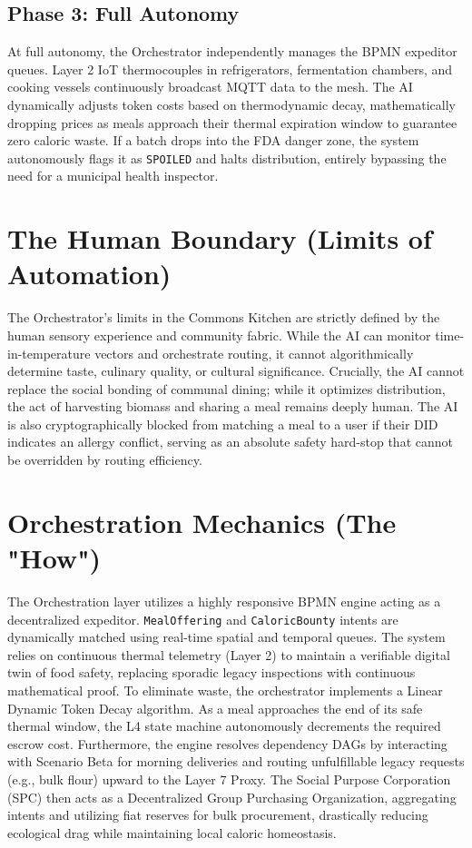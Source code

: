 \subsection{Phase 3: Full Autonomy}
At full autonomy, the Orchestrator independently manages the BPMN expeditor queues. Layer 2 IoT thermocouples in refrigerators, fermentation chambers, and cooking vessels continuously broadcast MQTT data to the mesh. The AI dynamically adjusts token costs based on thermodynamic decay, mathematically dropping prices as meals approach their thermal expiration window to guarantee zero caloric waste. If a batch drops into the FDA danger zone, the system autonomously flags it as \texttt{SPOILED} and halts distribution, entirely bypassing the need for a municipal health inspector.

\section{The Human Boundary (Limits of Automation)}
The Orchestrator's limits in the Commons Kitchen are strictly defined by the human sensory experience and community fabric. While the AI can monitor time-in-temperature vectors and orchestrate routing, it cannot algorithmically determine taste, culinary quality, or cultural significance. Crucially, the AI cannot replace the social bonding of communal dining; while it optimizes distribution, the act of harvesting biomass and sharing a meal remains deeply human. The AI is also cryptographically blocked from matching a meal to a user if their DID indicates an allergy conflict, serving as an absolute safety hard-stop that cannot be overridden by routing efficiency.

\section{Orchestration Mechanics (The "How")}
The Orchestration layer utilizes a highly responsive BPMN engine acting as a decentralized expeditor. \texttt{MealOffering} and \texttt{CaloricBounty} intents are dynamically matched using real-time spatial and temporal queues. The system relies on continuous thermal telemetry (Layer 2) to maintain a verifiable digital twin of food safety, replacing sporadic legacy inspections with continuous mathematical proof. 
To eliminate waste, the orchestrator implements a Linear Dynamic Token Decay algorithm. As a meal approaches the end of its safe thermal window, the L4 state machine autonomously decrements the required escrow cost.
Furthermore, the engine resolves dependency DAGs by interacting with Scenario Beta for morning deliveries and routing unfulfillable legacy requests (e.g., bulk flour) upward to the Layer 7 Proxy. The Social Purpose Corporation (SPC) then acts as a Decentralized Group Purchasing Organization, aggregating intents and utilizing fiat reserves for bulk procurement, drastically reducing ecological drag while maintaining local caloric homeostasis.

